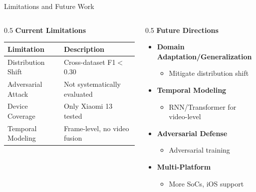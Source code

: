 \documentclass[aspectratio=169,12pt]{beamer}
\newcommand{\highlight}[1]{\textcolor{primaryblue}{\textbf{#1}}}
\begin{document}
\begin{frame}{Limitations and Future Work}
\begin{columns}[T]
\begin{column}{0.5\textwidth}
\textbf{Current Limitations}
\begin{center}
\scriptsize
\begin{tabular}{lp{4cm}}
\toprule
\textbf{Limitation} & \textbf{Description} \\
\midrule
Distribution Shift & Cross-dataset F1$<$0.30 \\
Adversarial Attack & Not systematically evaluated \\
Device Coverage & Only Xiaomi 13 tested \\
Temporal Modeling & Frame-level, no video fusion \\
\bottomrule
\end{tabular}
\end{center}
\end{column}

\begin{column}{0.5\textwidth}
\textbf{Future Directions}
\begin{itemize}
    \item \highlight{Domain Adaptation/Generalization}
    \begin{itemize}
        \item Mitigate distribution shift
    \end{itemize}
    \item \highlight{Temporal Modeling}
    \begin{itemize}
        \item RNN/Transformer for video-level
    \end{itemize}
    \item \highlight{Adversarial Defense}
    \begin{itemize}
        \item Adversarial training
    \end{itemize}
    \item \highlight{Multi-Platform}
    \begin{itemize}
        \item More SoCs, iOS support
    \end{itemize}
\end{itemize}
\end{column}
\end{columns}

\vspace{0.5em}
\begin{center}
\end{center}
\end{frame}
\end{document}
